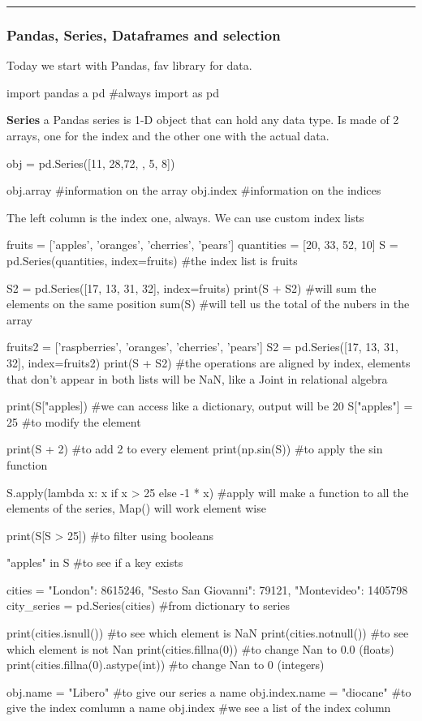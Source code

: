 \hrule
\subsubsection{Pandas, Series, Dataframes and selection}

Today we start with Pandas, fav library for data.

\begin{pythoncode}
    import pandas a pd #always import as pd
\end{pythoncode}

\textbf{Series} \ra a Pandas series is 1-D object that can hold any data type. Is made of 2 arrays, one for the index and the other one with the actual data.

\begin{pythoncode}
    obj = pd.Series([11, 28,72, , 5, 8])

    obj.array #information on the array
    obj.index #information on the indices
\end{pythoncode}

The left column is the index one, always. We can use custom index lists

\begin{pythoncode}
    fruits = ['apples', 'oranges', 'cherries', 'pears']
    quantities = [20, 33, 52, 10]
    S = pd.Series(quantities, index=fruits)
    #the index list is fruits

    S2 = pd.Series([17, 13, 31, 32], index=fruits)
    print(S + S2) #will sum the elements on the same position
    sum(S) #will tell us the total of the nubers in the array

    fruits2 = ['raspberries', 'oranges', 'cherries', 'pears']
    S2 = pd.Series([17, 13, 31, 32], index=fruits2)
    print(S + S2) #the operations are aligned by index, elements that don't appear in both lists will be NaN, like a Joint in relational algebra

    print(S["apples]) #we can access like a dictionary, output will be 20
    S["apples"] = 25 #to modify the element

    print(S + 2) #to add 2 to every element
    print(np.sin(S)) #to apply the sin function

    S.apply(lambda x: x if x > 25 else -1 * x) #apply will make a function to all the elements of the series, Map() will work element wise

    print(S[S > 25]) #to filter using booleans

    "apples" in S #to see if a key exists

    cities = {"London": 8615246,
    "Sesto San Giovanni": 79121,
    "Montevideo": 1405798}
    city_series = pd.Series(cities) #from dictionary to series

    print(cities.isnull()) #to see which element is NaN
    print(cities.notnull()) #to see which element is not Nan
    print(cities.fillna(0)) #to change Nan to 0.0 (floats)
    print(cities.fillna(0).astype(int)) #to change Nan to 0 (integers)

    obj.name = "Libero" #to give our series a name
    obj.index.name = "diocane" #to give the index comlumn a name
    obj.index #we see a list of the index column
\end{pythoncode}

